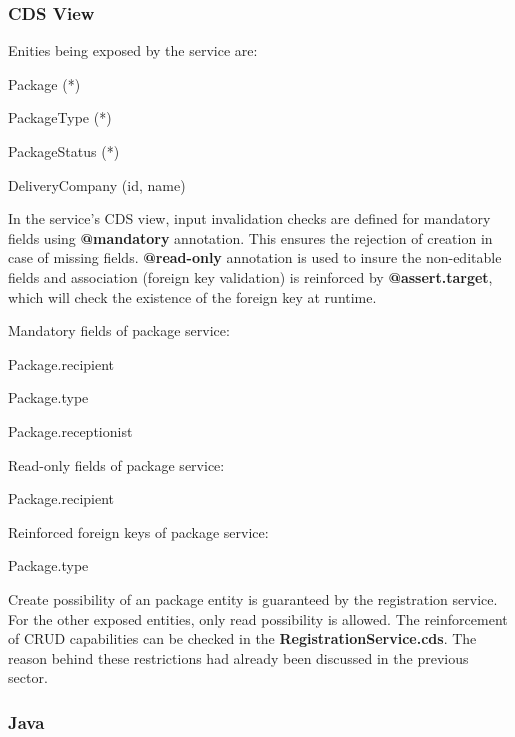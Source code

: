 \subsubsection{CDS View}

Enities being exposed by the service are:
\begin{compactenum}
	\item Package (*)
    \item PackageType (*)
    \item PackageStatus (*)
    \item DeliveryCompany (id, name)
\end{compactenum}

\bigskip
In the service's CDS view, input invalidation checks are defined for mandatory fields using \textbf{@mandatory} annotation. This ensures the rejection of creation in case of missing fields. \textbf{@read-only} annotation is used to insure the non-editable fields and association (foreign key validation) is reinforced by \textbf{@assert.target}, which will check the existence of the foreign key at runtime.

\bigskip
Mandatory fields of package service:
\begin{compactenum}
	\item Package.recipient
    \item Package.type
    \item Package.receptionist
\end{compactenum}

\bigskip
Read-only fields of package service:
\begin{compactenum}
	\item Package.recipient
\end{compactenum}

\bigskip
Reinforced foreign keys of package service:
\begin{compactenum}
	\item Package.type
\end{compactenum}

\bigskip
Create possibility of an package entity is guaranteed by the registration service. For the other exposed entities, only read possibility is allowed. The reinforcement of CRUD capabilities can be checked in the \textbf{RegistrationService.cds}. The reason behind these restrictions had already been discussed in the previous sector.

\subsubsection{Java}

